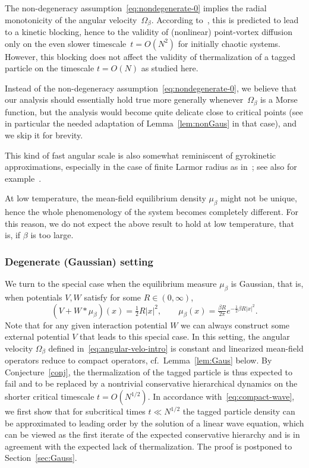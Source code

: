 \documentclass[a4paper,11pt,reqno,noindent]{amsart}
\theoremstyle{plain}
\numberwithin{equation}{section}
\newcommand{\3}{|\!|\!|}
\begin{document}
The non-degeneracy assumption~\eqref{eq:nondegenerate-0} implies the radial monotonicity of the angular velocity~$\Omega_\beta$. According to~\cite{Chavanis-Lemou-07}, this is predicted to lead to a kinetic blocking, hence to the validity of (nonlinear) point-vortex diffusion only on the even slower timescale~\mbox{$t=O(N^2)$} for initially chaotic systems.
However, this blocking does not affect the validity of thermalization of a tagged particle on the timescale $t=O(N)$ as studied here.

Instead of the non-degeneracy assumption~\eqref{eq:nondegenerate-0}, we believe that our analysis should essentially hold true more generally whenever~$\Omega_\beta$ is a Morse function, but the analysis would become quite delicate close to critical points (see in particular the needed adaptation of Lemma~\ref{lem:nonGaus} in that case), and we skip it for brevity.

This kind of fast angular scale is also somewhat reminiscent of gyrokinetic approximations, especially in the case of finite Larmor radius as in~\cite{FrenodSonnen}; see also for example~\cite{Bostan}. 

{At low temperature, the mean-field equilibrium density $\mu_\beta$ might not be unique, hence the whole phenomenology of the system becomes completely different. For this reason, we do not expect the above result to hold at low temperature, that is, if $\beta$ is too large.}

\subsubsection{Degenerate (Gaussian) setting}
We turn to the special case when the equilibrium measure $\mu_\beta$ is Gaussian, that is, when potentials $V,W$ satisfy for some $R\in(0,\infty)$,
\begin{equation}\label{eq:Gaussian0}
(V+W\ast\mu_\beta)(x)=\tfrac12R|x|^2,\qquad\mu_\beta(x)=\tfrac{\beta R}{2\pi}e^{-\frac12\beta R|x|^2}.
\end{equation}
Note that for any given interaction potential $W$ we can always construct some external potential $V$ that leads to this special case.
In this setting, the angular velocity $\Omega_\beta$ defined in~\eqref{eq:angular-velo-intro} is constant and linearized mean-field operators reduce to compact operators, cf.~Lemma~\ref{lem:Gaus} below. By Conjecture~\ref{conj}, the thermalization of the tagged particle is thus expected to fail and to be replaced by a nontrivial conservative hierarchical dynamics on the shorter critical timescale $t=O(N^{1/2})$.
In accordance with~\eqref{eq:compact-wave}, we first show that {for subcritical times $t\ll N^{1/2}$ the tagged particle density can be approximated to leading order by the solution of a linear wave equation, which can be viewed as the first iterate of the expected conservative hierarchy and is in agreement with the expected lack of thermalization.}
The proof is postponed to Section~\ref{sec:Gauss}.
\end{document}
